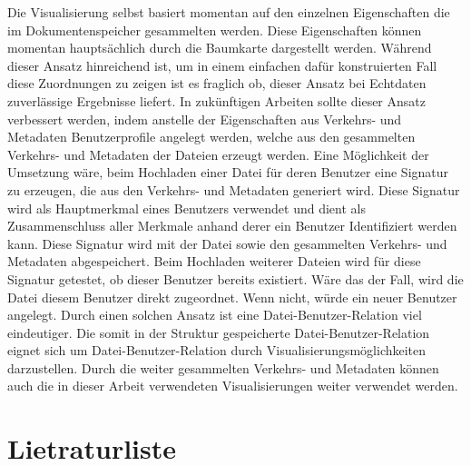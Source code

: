 \documentclass[
    fontsize=12pt,
    headings=small,
    parskip=half,           %
    bibliography=totoc,
    numbers=noenddot,       %
    open=any,               %
    ]{scrreprt}
\begin{document}
Die Visualisierung selbst basiert momentan auf den einzelnen Eigenschaften die im Dokumentenspeicher gesammelten werden. 
Diese Eigenschaften können momentan hauptsächlich durch die Baumkarte dargestellt werden.
Während dieser Ansatz hinreichend ist, um in einem einfachen dafür konstruierten Fall diese Zuordnungen zu zeigen ist es fraglich ob, dieser Ansatz bei Echtdaten zuverlässige Ergebnisse liefert.
In zukünftigen Arbeiten sollte dieser Ansatz verbessert werden, indem anstelle der Eigenschaften aus Verkehrs- und Metadaten Benutzerprofile angelegt werden, welche aus den gesammelten Verkehrs- und Metadaten der Dateien erzeugt werden.     
Eine Möglichkeit der Umsetzung wäre, beim Hochladen einer Datei für deren Benutzer eine Signatur zu erzeugen, die aus den Verkehrs- und Metadaten generiert wird.
Diese Signatur wird als Hauptmerkmal eines Benutzers verwendet und dient als Zusammenschluss aller Merkmale anhand derer ein Benutzer Identifiziert werden kann.
Diese Signatur wird mit der Datei sowie den gesammelten Verkehrs- und Metadaten abgespeichert.
Beim Hochladen weiterer Dateien wird für diese Signatur getestet, ob dieser Benutzer bereits existiert.
Wäre das der Fall, wird die Datei diesem Benutzer direkt zugeordnet.
Wenn nicht, würde ein neuer Benutzer angelegt.
Durch einen solchen Ansatz ist eine Datei-Benutzer-Relation viel eindeutiger.
Die somit in der Struktur gespeicherte Datei-Benutzer-Relation eignet sich um Datei-Benutzer-Relation durch Visualisierungsmöglichkeiten darzustellen. 
Durch die weiter gesammelten Verkehrs- und Metadaten können auch die in dieser Arbeit verwendeten Visualisierungen weiter verwendet werden.

\chapter*{Lietraturliste}
\printbibliography
\end{document}
